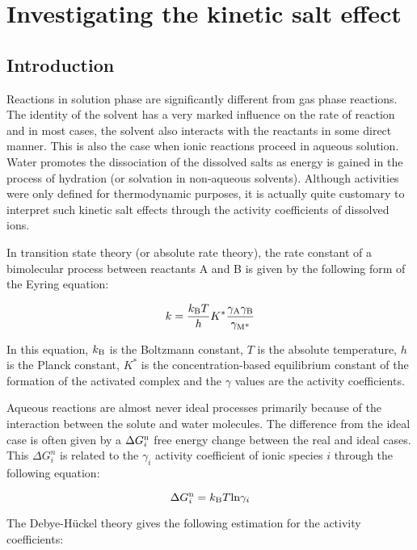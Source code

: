 \section{Investigating the kinetic salt effect}
\subsection{Introduction}

Reactions in solution phase are significantly different from gas phase reactions. The identity of the solvent has a very marked influence on the rate of reaction and in most cases, the solvent also interacts with the reactants in some direct manner. This is also the case when ionic reactions proceed in aqueous solution. Water promotes the dissociation of the dissolved salts as energy is gained in the process of hydration (or solvation in non-aqueous solvents). Although activities were only defined for thermodynamic purposes, it is actually quite customary to interpret such kinetic salt effects through the activity coefficients of dissolved ions.

In transition state theory (or absolute rate theory), the rate constant of a bimolecular process between reactants A and B is given by the following form of the Eyring equation:

\begin{equation}
k = \frac{k_{\text B} T}{h} K^* \frac{\gamma_{\text A} \gamma_{\text B}}{\gamma_{\text{M*}}}
\end{equation}

In this equation, $k_{\text B}$ is the Boltzmann constant, $T$ is the absolute temperature, $h$ is the Planck constant, $K^*$ is the concentration-based equilibrium constant of the formation of the activated complex and the $\gamma$ values are the activity coefficients.

Aqueous reactions are almost never ideal processes primarily because of the interaction between the solute and water molecules. The difference from the ideal case is often given by a $\Delta G_i^{\text n}$ free energy change between the real and ideal cases. This $\Delta G_i^n$ is related to the $\gamma_i$ activity coefficient of ionic species $i$ through the following equation:

\begin{equation}
\Delta G_i^{\text n} = k_{\text B} T \text {ln} \gamma_i
\end{equation}

The Debye-H\"uckel theory gives the following estimation for the activity coefficients:

